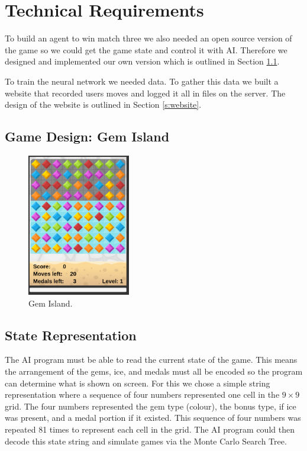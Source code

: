 \documentclass{bhamthesis}
\theoremstyle{definition}
\begin{document}
\chapter{Technical Requirements}
To build an agent to win match three we also needed an open source version of the game so we could get the game state and control it with AI. Therefore we designed and implemented our own version which is outlined in Section \ref{s:gamed}. 

To train the neural network we needed data. To gather this data we built a website that recorded users moves and logged it all in files on the server. The design of the website is outlined in Section \ref{s:website}.

\section{Game Design: Gem Island}\label{s:gamed}

\begin{figure}
	\centering
	\includegraphics[width=0.4\textwidth]{media/img/screen2}
	\caption{Gem Island.}\label{f:gemIslandGame}
\end{figure}

\section{State Representation}\label{s:state}
The AI program must be able to read the current state of the game. This means the arrangement of the gems, ice, and medals must all be encoded so the program can determine what is shown on screen. For this we chose a simple string representation where a sequence of four numbers represented one cell in the $9 \times 9$ grid. The four numbers represented the gem type (colour), the bonus type, if ice was present, and a medal portion if it existed. This sequence of four numbers was repeated 81 times to represent each cell in the grid. The AI program could then decode this state string and simulate games via the Monte Carlo Search Tree.
\end{document}
